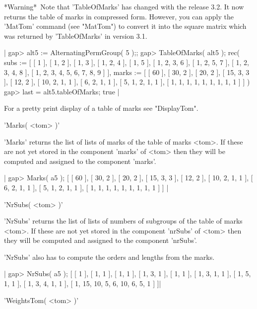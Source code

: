 *Warning*\:\  Note  that  'TableOfMarks'  has  changed with  the  release
{\GAP}  3.2.  It  now returns  the table  of  marks  in compressed  form.
However, you  can apply the 'MatTom' command (see "MatTom") to convert it
into  the square  matrix  which was  returned by 'TableOfMarks' in {\GAP}
version 3.1.

|    gap> alt5 := AlternatingPermGroup( 5 );;
    gap> TableOfMarks( alt5 );
    rec(
      subs := [ [ 1 ], [ 1, 2 ], [ 1, 3 ], [ 1, 2, 4 ], [ 1, 5 ],
          [ 1, 2, 3, 6 ], [ 1, 2, 5, 7 ], [ 1, 2, 3, 4, 8 ],
          [ 1, 2, 3, 4, 5, 6, 7, 8, 9 ] ],
      marks := [ [ 60 ], [ 30, 2 ], [ 20, 2 ], [ 15, 3, 3 ], [ 12, 2 ],
          [ 10, 2, 1, 1 ], [ 6, 2, 1, 1 ], [ 5, 1, 2, 1, 1 ],
          [ 1, 1, 1, 1, 1, 1, 1, 1, 1 ] ] )
    gap> last = alt5.tableOfMarks;
    true |

For a pretty print display of a table of marks see "DisplayTom".


'Marks( <tom> )'

'Marks' returns the list of lists of marks  of the table of  marks <tom>.
If  these are not yet stored in the  component 'marks' of <tom> then they
will be computed and assigned to the component 'marks'.

|    gap> Marks( a5 );
    [ [ 60 ], [ 30, 2 ], [ 20, 2 ], [ 15, 3, 3 ], [ 12, 2 ], 
      [ 10, 2, 1, 1 ], [ 6, 2, 1, 1 ], [ 5, 1, 2, 1, 1 ], 
      [ 1, 1, 1, 1, 1, 1, 1, 1, 1 ] ] |


'NrSubs( <tom> )'

'NrSubs' returns the list of lists of numbers  of subgroups of the  table
of marks <tom>.  If these are not yet stored in the component 'nrSubs' of
<tom> then they will be computed and assigned to the component 'nrSubs'.

'NrSubs' also has to compute the orders and lengths from the marks.

|    gap> NrSubs( a5 );
    [ [ 1 ], [ 1, 1 ], [ 1, 1 ], [ 1, 3, 1 ], [ 1, 1 ], [ 1, 3, 1, 1 ], 
      [ 1, 5, 1, 1 ], [ 1, 3, 4, 1, 1 ], [ 1, 15, 10, 5, 6, 10, 6, 5, 1 ] 
     ]|


'WeightsTom( <tom> )'

